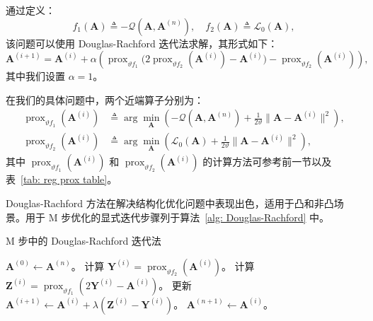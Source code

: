 通过定义：
\begin{equation}
    f_1(\mathbf{A}) \triangleq -\mathcal{Q}(\mathbf{A}, \mathbf{A}^{(n)}), \quad f_2(\mathbf{A}) \triangleq \mathcal{L}_0(\mathbf{A}),
\end{equation}
该问题可以使用 Douglas-Rachford 迭代法求解，其形式如下：
\begin{equation}
    \mathbf{A}^{(i+1)} = \mathbf{A}^{(i)} + \alpha \left( \operatorname{prox}_{\vartheta f_1} \big(2 \operatorname{prox}_{\vartheta f_2}(\mathbf{A}^{(i)}) - \mathbf{A}^{(i)} \big) - \operatorname{prox}_{\vartheta f_2}(\mathbf{A}^{(i)}) \right),
\end{equation}
其中我们设置 \(\alpha = 1\)。

在我们的具体问题中，两个近端算子分别为：
\begin{align*}
    \operatorname{prox}_{\vartheta f_1}(\mathbf{A}^{(i)}) &\triangleq \arg\min_{\mathbf{A}} \left( -\mathcal{Q}(\mathbf{A}, \mathbf{A}^{(n)}) + \frac{1}{2\vartheta} \| \mathbf{A} - \mathbf{A}^{(i)} \|^2 \right), \\
    \operatorname{prox}_{\vartheta f_2}(\mathbf{A}^{(i)}) &\triangleq \arg\min_{\mathbf{A}} \left( \mathcal{L}_0(\mathbf{A}) + \frac{1}{2\vartheta} \| \mathbf{A} - \mathbf{A}^{(i)} \|^2 \right),
\end{align*}
其中 \(\operatorname{prox}_{\vartheta f_1}(\mathbf{A}^{(i)})\) 和 \(\operatorname{prox}_{\vartheta f_2}(\mathbf{A}^{(i)})\) 的计算方法可参考前一节以及表~\ref{tab: reg prox table}。

Douglas-Rachford 方法在解决结构化优化问题中表现出色，适用于凸和非凸场景。用于 M 步优化的显式迭代步骤列于算法~\ref{alg: Douglas-Rachford} 中。

\begin{algorithm}[tb]
    \caption{M 步中的 Douglas-Rachford 迭代法}
    \label{alg: Douglas-Rachford}
    \begin{algorithmic}[1]
        \STATE \(\mathbf{A}^{(0)} \gets \mathbf{A}^{(n)}\)。
            \STATE 计算 \(\mathbf{Y}^{(i)} = \operatorname{prox}_{\vartheta f_2}(\mathbf{A}^{(i)})\)。
            \STATE 计算 \(\mathbf{Z}^{(i)} = \operatorname{prox}_{\vartheta f_1}(2\mathbf{Y}^{(i)} - \mathbf{A}^{(i)})\)。
            \STATE 更新 \(\mathbf{A}^{(i+1)} \gets \mathbf{A}^{(i)} + \lambda (\mathbf{Z}^{(i)} - \mathbf{Y}^{(i)})\)。 
        \ENDFOR
        \STATE \(\mathbf{A}^{(n+1)} \gets \mathbf{A}^{(i)}\)。
    \end{algorithmic}
\end{algorithm}

